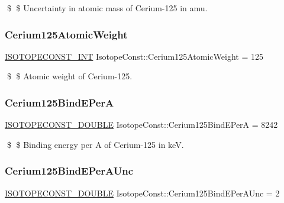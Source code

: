 \$ \$ Uncertainty in atomic mass of Cerium-\/125 in amu. \mbox{\label{group___isotope_const-_cerium-_ce125_ga53dd9358a5b4273d587ad5db96b4a88b}} 
\subsubsection{\texorpdfstring{Cerium125\+Atomic\+Weight}{Cerium125AtomicWeight}}
{\footnotesize\ttfamily \mbox{\hyperlink{group___isotope_const-_macros_ga5f18360b3e99483a35c32d789e62621c}{I\+S\+O\+T\+O\+P\+E\+C\+O\+N\+S\+T\+\_\+\+I\+NT}} Isotope\+Const\+::\+Cerium125\+Atomic\+Weight = 125}

\$ \$ Atomic weight of Cerium-\/125. \mbox{\label{group___isotope_const-_cerium-_ce125_gae60455daa0b1b877aec7dd8f5821aa26}} 
\subsubsection{\texorpdfstring{Cerium125\+Bind\+E\+PerA}{Cerium125BindEPerA}}
{\footnotesize\ttfamily \mbox{\hyperlink{group___isotope_const-_macros_ga8f45a7272ce02c0b4c65c44636ed719a}{I\+S\+O\+T\+O\+P\+E\+C\+O\+N\+S\+T\+\_\+\+D\+O\+U\+B\+LE}} Isotope\+Const\+::\+Cerium125\+Bind\+E\+PerA = 8242}

\$ \$ Binding energy per A of Cerium-\/125 in keV. \mbox{\label{group___isotope_const-_cerium-_ce125_gaa1cafba15920489b0ce5f0a566562617}} 
\subsubsection{\texorpdfstring{Cerium125\+Bind\+E\+Per\+A\+Unc}{Cerium125BindEPerAUnc}}
{\footnotesize\ttfamily \mbox{\hyperlink{group___isotope_const-_macros_ga8f45a7272ce02c0b4c65c44636ed719a}{I\+S\+O\+T\+O\+P\+E\+C\+O\+N\+S\+T\+\_\+\+D\+O\+U\+B\+LE}} Isotope\+Const\+::\+Cerium125\+Bind\+E\+Per\+A\+Unc = 2}

